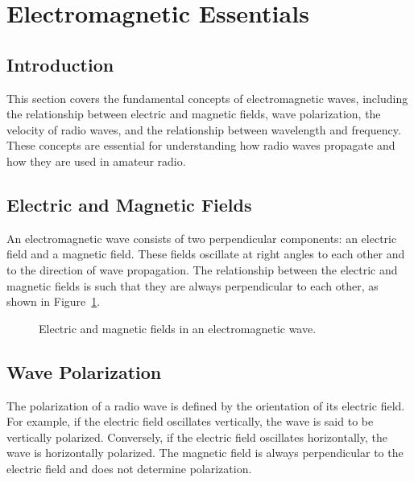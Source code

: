 \section{Electromagnetic Essentials}
\label{section:electromagnetic_essentials}

\subsection*{Introduction}
This section covers the fundamental concepts of electromagnetic waves, including the relationship between electric and magnetic fields, wave polarization, the velocity of radio waves, and the relationship between wavelength and frequency. These concepts are essential for understanding how radio waves propagate and how they are used in amateur radio.

\subsection*{Electric and Magnetic Fields}
An electromagnetic wave consists of two perpendicular components: an electric field and a magnetic field. These fields oscillate at right angles to each other and to the direction of wave propagation. The relationship between the electric and magnetic fields is such that they are always perpendicular to each other, as shown in Figure~\ref{fig:em_fields}.

\begin{figure}[h!]
    \centering
    \caption{Electric and magnetic fields in an electromagnetic wave.}
    \label{fig:em_fields}
\end{figure}

\subsection*{Wave Polarization}
The polarization of a radio wave is defined by the orientation of its electric field. For example, if the electric field oscillates vertically, the wave is said to be vertically polarized. Conversely, if the electric field oscillates horizontally, the wave is horizontally polarized. The magnetic field is always perpendicular to the electric field and does not determine polarization.


